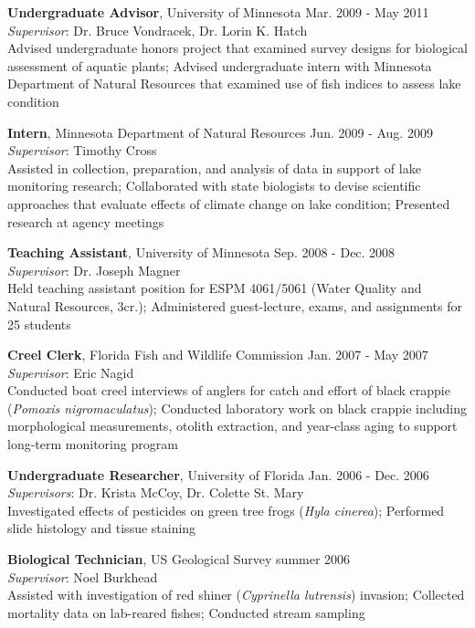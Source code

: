 \documentclass[letterpaper,12pt]{article}
\begin{document}
{\bf Undergraduate Advisor}, University of Minnesota \hfill Mar. 2009 - May 2011 \\
\textit{Supervisor}: Dr. Bruce Vondracek, Dr. Lorin K. Hatch \\
Advised undergraduate honors project that examined survey designs for biological assessment of aquatic plants; Advised undergraduate intern with Minnesota Department of Natural Resources that examined use of fish indices to assess lake condition 

{\bf Intern}, Minnesota Department of Natural Resources \hfill Jun. 2009 - Aug. 2009 \\
\textit{Supervisor}: Timothy Cross \\
Assisted in collection, preparation, and analysis of data in support of lake monitoring research; Collaborated with state biologists to devise scientific approaches that evaluate effects of climate change on lake condition; Presented research at agency meetings

{\bf Teaching Assistant}, University of Minnesota \hfill Sep. 2008 - Dec. 2008 \\
\textit{Supervisor}: Dr. Joseph Magner \\
Held teaching assistant position for ESPM 4061/5061 (Water Quality and Natural Resources, 3cr.); Administered guest-lecture, exams, and assignments for 25 students

{\bf Creel Clerk}, Florida Fish and Wildlife Commission \hfill Jan. 2007 - May 2007 \\
\textit{Supervisor}: Eric Nagid \\
Conducted boat creel interviews of anglers for catch and effort of black crappie (\textit{Pomoxis nigromaculatus}); Conducted laboratory work on black crappie including morphological measurements, otolith extraction, and year-class aging to support long-term monitoring program

{\bf Undergraduate Researcher}, University of Florida \hfill Jan. 2006 - Dec. 2006 \\
\textit{Supervisors}: Dr. Krista McCoy, Dr. Colette St. Mary \\
Investigated effects of pesticides on green tree frogs (\textit{Hyla cinerea}); Performed slide histology and tissue staining

{\bf Biological Technician}, US Geological Survey \hfill summer 2006 \\
\textit{Supervisor}: Noel Burkhead \\
Assisted with investigation of red shiner (\textit{Cyprinella lutrensis}) invasion; Collected mortality data on lab-reared fishes; Conducted stream sampling
\end{document}
